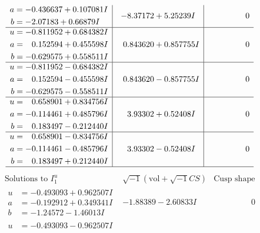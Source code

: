 \documentclass[1p]{elsarticle_modified}
\theoremstyle{definition}
\newcommand{\I}{\sqrt{-1}}
\begin{document}
$$\begin{array}{c|c|c}
\begin{aligned}
a &= -0.436637 + 0.107081 I \\
b &= -2.07183 + 0.66879 I\end{aligned}
 & -8.37172 + 5.25239 I & \phantom{-0.000000 } 0 \\ \hline\begin{aligned}
u &= -0.811952 + 0.684382 I \\
a &= \phantom{-}0.152594 + 0.455598 I \\
b &= -0.629575 + 0.558511 I\end{aligned}
 & \phantom{-}0.843620 + 0.857755 I & \phantom{-0.000000 } 0 \\ \hline\begin{aligned}
u &= -0.811952 - 0.684382 I \\
a &= \phantom{-}0.152594 - 0.455598 I \\
b &= -0.629575 - 0.558511 I\end{aligned}
 & \phantom{-}0.843620 - 0.857755 I & \phantom{-0.000000 } 0 \\ \hline\begin{aligned}
u &= \phantom{-}0.658901 + 0.834756 I \\
a &= -0.114461 + 0.485796 I \\
b &= \phantom{-}0.183497 - 0.212440 I\end{aligned}
 & \phantom{-}3.93302 + 0.52408 I & \phantom{-0.000000 } 0 \\ \hline\begin{aligned}
u &= \phantom{-}0.658901 - 0.834756 I \\
a &= -0.114461 - 0.485796 I \\
b &= \phantom{-}0.183497 + 0.212440 I\end{aligned}
 & \phantom{-}3.93302 - 0.52408 I & \phantom{-0.000000 } 0\\
 \hline 
 \end{array}$$\newpage$$\begin{array}{c|c|c}  
\text{Solutions to }I^u_{1}& \I (\text{vol} + \sqrt{-1}CS) & \text{Cusp shape}\\
 \hline 
\begin{aligned}
u &= -0.493093 + 0.962507 I \\
a &= -0.192912 + 0.349341 I \\
b &= -1.24572 - 1.46013 I\end{aligned}
 & -1.88389 - 2.60833 I & \phantom{-0.000000 } 0 \\ \hline\begin{aligned}
u &= -0.493093 - 0.962507 I \\

\end{aligned}
\end{array}$$
\end{document}
